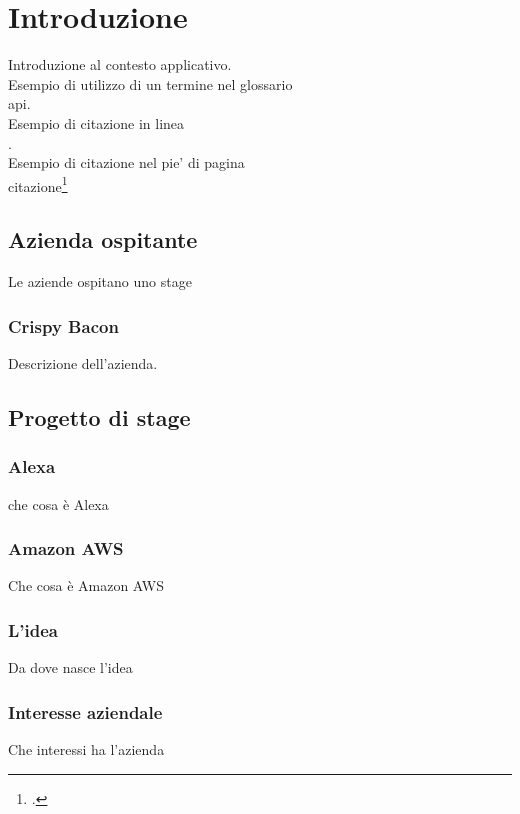 
\chapter{Introduzione}
\label{cap:introduzione}
Introduzione al contesto applicativo.\\
\noindent Esempio di utilizzo di un termine nel glossario \\
\gls{api}. \\

\noindent Esempio di citazione in linea \\
\cite{site:agile-manifesto}. \\

\noindent Esempio di citazione nel pie' di pagina \\
citazione\footcite{womak:lean-thinking} \\

\section{Azienda ospitante}
Le aziende ospitano uno stage
\subsection{Crispy Bacon}
Descrizione dell'azienda.
\section{Progetto di stage}
\subsection{Alexa}
che cosa è Alexa
\subsection{Amazon AWS}
Che cosa è Amazon AWS
\subsection{L'idea}
Da dove nasce l'idea
\subsection{Interesse aziendale}
Che interessi ha l'azienda
